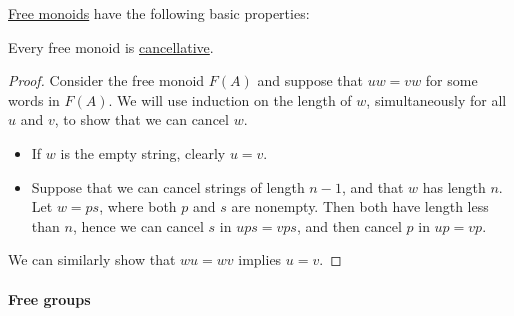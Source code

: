\begin{proposition}\label{thm:def:free_monoid}
  \hyperref[def:free_monoid]{Free monoids} have the following basic properties:
  \begin{thmenum}
     Every free monoid is \hyperref[def:binary_operation/cancellative]{cancellative}.
  \end{thmenum}
\end{proposition}
\begin{proof}
   Consider the free monoid \( F(A) \) and suppose that \( uw = vw \) for some words in \( F(A) \). We will use induction on the length of \( w \), simultaneously for all \( u \) and \( v \), to show that we can cancel \( w \).
  \begin{itemize}
    \item If \( w \) is the empty string, clearly \( u = v \).
    \item Suppose that we can cancel strings of length \( n - 1 \), and that \( w \) has length \( n \). Let \( w = ps \), where both \( p \) and \( s \) are nonempty. Then both have length less than \( n \), hence we can cancel \( s \) in \( ups = vps \), and then cancel \( p \) in \( up = vp \).
  \end{itemize}

  We can similarly show that \( wu = wv \) implies \( u = v \).
\end{proof}

\paragraph{Free groups}

